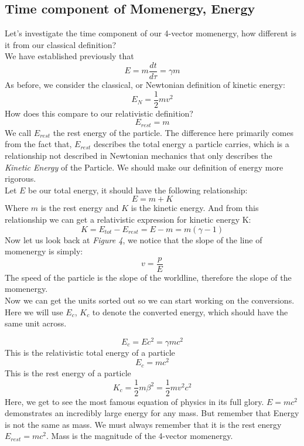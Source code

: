 \documentclass[12pt]{book}
\newcommand{\dydx}[2]{\frac{d #1}{d #2}}
\begin{document}
\subsection{Time component of Momenergy, Energy}
Let's investigate the time component of our 4-vector momenergy, how different is it from our classical definition?\\
\newline 
We have established previously that 
\[
E =m \dydx{t}{\tau} =\gamma m
\]
As before, we consider the classical, or Newtonian definition of kinetic energy:
\[
E_{N} = \frac{1}{2}mv^2
\]
How does this compare to our relativistic definition?
\[
E_{rest} = m
\]
We call $E_{rest}$ the rest energy of the particle. The difference here primarily comes from the fact that, $E_{rest}$ describes the total energy a particle carries, which is a relationship not described in Newtonian mechanics that only describes the \textit{Kinetic Energy} of the Particle. We should make our definition of energy more rigorous. \\
\newline
Let $E$ be our total energy, it should have the following relationship:
\[
E = m + K
\]
Where $m$ is the rest energy and $K$ is the kinetic energy. And from this relationship we can get a relativistic expression for kinetic energy K:
\[
K = E_{tot} - E_{rest} = E - m = m(\gamma - 1)
\]
Now let us look back at \textit{Figure 4}, we notice that the slope of the line of momenergy is simply:
\[
v = \frac{p}{E}
\]
The speed of the particle is the slope of the worldline, therefore the slope of the momenergy. \\
\newline
Now we can get the units sorted out so we can start working on the conversions. Here we will use $E_c$, $K_c$ to denote the converted energy, which should have the same unit across.

\[
E_c = Ec^2 = \gamma mc^2
\]
This is the relativistic total energy of a particle 
\[
E_c = mc^2
\]
This is the rest energy of a particle
\[
K_c = \frac{1}{2}m\beta^2= \frac{1}{2}mv^2c^2 
\]
Here, we get to see the most famous equation of physics in its full glory. $E = mc^2$ demonstrates an incredibly large energy for any mass. But remember that Energy is not the same as mass. We must always remember that it is the rest energy $E_{rest} = mc^2$. Mass is the magnitude of the 4-vector momenergy. 
\end{document}
